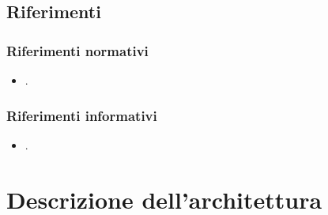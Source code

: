 \subsection{Riferimenti}
\subsubsection{Riferimenti normativi}
\begin{itemize}
\item .
\end{itemize}

\subsubsection{Riferimenti informativi}
\begin{itemize}
\item .
\end{itemize} 

\section{Descrizione dell'architettura}
